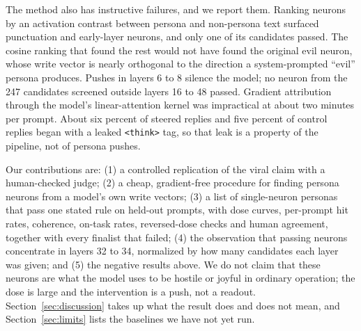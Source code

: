 The method also has instructive failures, and we report them. Ranking neurons by an activation contrast
between persona and non-persona text surfaced punctuation and early-layer neurons, and only one of its
candidates passed. The cosine ranking that found the rest would not have found the original evil neuron,
whose write vector is nearly orthogonal to the direction a system-prompted ``evil'' persona produces. Pushes
in layers 6 to 8 silence the model; no neuron from the 247 candidates screened outside layers 16 to 48 passed.
Gradient attribution through the model's linear-attention kernel was impractical at about two minutes per
prompt. About six percent of steered replies and five percent of control replies began with a leaked
\texttt{<think>} tag, so that leak is a property of the pipeline, not of persona pushes.

Our contributions are: (1) a controlled replication of the viral claim with a human-checked judge; (2) a
cheap, gradient-free procedure for finding persona neurons from a model's own write vectors; (3) a list of
\nFound{} single-neuron personas that pass one stated rule on held-out prompts, with dose curves, per-prompt
hit rates, coherence, on-task rates, reversed-dose checks and human agreement, together with every finalist
that failed; (4) the observation that passing neurons concentrate in layers 32 to 34, normalized by how many
candidates each layer was given; and (5) the negative results above. We do not claim that these neurons are
what the model uses to be hostile or joyful in ordinary operation; the dose is large and the intervention is
a push, not a readout. Section~\ref{sec:discussion} takes up what the result does and does not mean, and
Section~\ref{sec:limits} lists the baselines we have not yet run.
